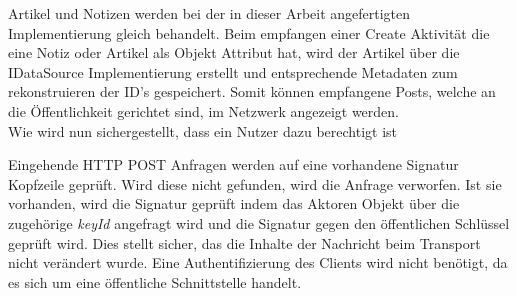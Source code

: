 Artikel und Notizen werden bei der in dieser Arbeit angefertigten Implementierung gleich behandelt. Beim empfangen einer Create Aktivität die eine Notiz oder Artikel als Objekt Attribut hat, wird der Artikel über die IDataSource Implementierung erstellt und entsprechende Metadaten zum rekonstruieren der ID's gespeichert. Somit können empfangene Posts, welche an die Öffentlichkeit gerichtet sind, im Netzwerk angezeigt werden.\\

Wie wird nun sichergestellt, dass ein Nutzer dazu berechtigt ist 

Eingehende HTTP POST Anfragen werden auf eine vorhandene Signatur Kopfzeile geprüft. Wird diese nicht gefunden, wird die Anfrage verworfen. Ist sie vorhanden, wird die Signatur geprüft indem das Aktoren Objekt über die zugehörige \textit{keyId} angefragt wird und die Signatur gegen den öffentlichen Schlüssel geprüft wird. Dies stellt sicher, das die Inhalte der Nachricht beim Transport nicht verändert wurde. Eine Authentifizierung des Clients wird nicht benötigt, da es sich um eine öffentliche Schnittstelle handelt.
